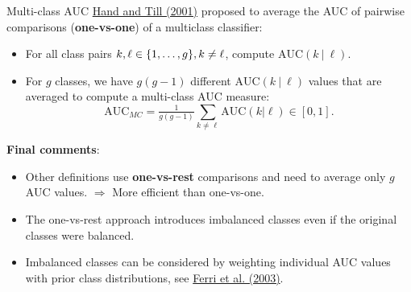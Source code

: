 \begin{vbframe}{Multi-class AUC}
\href{https://link.springer.com/article/10.1023/A:1010920819831}{Hand and Till (2001)} proposed to average the AUC of pairwise comparisons (\textbf{one-vs-one}) of a multiclass classifier:

\begin{itemize}
    \item For all class pairs $k, \ell \in \{1, \ldots, g\}, k \neq \ell$, compute $\text{AUC}(k ~|~ \ell)$.
    \item For $g$ classes, we have $g (g-1)$ different $\text{AUC}(k ~|~ \ell)$ values that are averaged to compute a multi-class AUC measure:
    $$\text{AUC}_{MC} = \tfrac{1}{g(g - 1)} \sum_{k \neq \ell} \text{AUC}(k | \ell) \in [0, 1].$$
\end{itemize}

\textbf{Final comments}:

\begin{itemize}
\item Other definitions use \textbf{one-vs-rest} comparisons and need to average only $g$ AUC values. $\Rightarrow$ More efficient than one-vs-one.
\item The one-vs-rest approach introduces imbalanced classes even if the original classes were balanced.
\item Imbalanced classes can be considered by weighting individual AUC values with prior class distributions, see \href{https://doi.org/10.1016/j.patrec.2008.08.010}{Ferri et al. (2003)}.
\end{itemize}

\end{vbframe}

